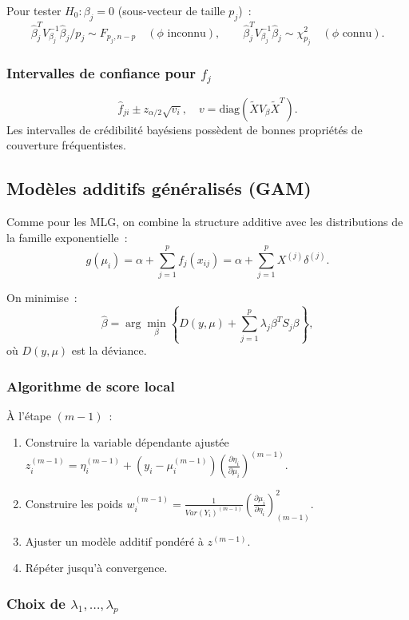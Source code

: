 \documentclass[11pt,letterpaper]{article}
\begin{document}
Pour tester $H_0: \beta_j = 0$ (sous-vecteur de taille $p_j$)~:
$$\hat{\beta}_j^T V_{\beta_j}^{-1}\hat{\beta}_j / p_j \sim F_{p_j, n-p} \quad (\phi \text{ inconnu}), \qquad \hat{\beta}_j^T V_{\beta_j}^{-1}\hat{\beta}_j \sim \chi^2_{p_j} \quad (\phi \text{ connu}).$$

\subsubsection{Intervalles de confiance pour $f_j$}
$$\hat{f}_{ji} \pm z_{\alpha/2}\sqrt{v_i}, \quad v = \text{diag}(\tilde{X}V_\beta\tilde{X}^T).$$
Les intervalles de crédibilité bayésiens possèdent de bonnes propriétés de couverture fréquentistes.

\subsection{Modèles additifs généralisés (GAM)}

Comme pour les MLG, on combine la structure additive avec les distributions de la famille exponentielle~:
$$g(\mu_i) = \alpha + \sum_{j=1}^p f_j(x_{ij}) = \alpha + \sum_{j=1}^p X^{(j)}\delta^{(j)}.$$

On minimise~:
$$\hat{\beta} = \arg\min_\beta\left\{D(y,\mu) + \sum_{j=1}^p \lambda_j \beta^T S_j \beta\right\},$$
où $D(y,\mu)$ est la déviance.

\subsubsection{Algorithme de score local}

À l'étape $(m-1)$~:
\begin{enumerate}
\item Construire la variable dépendante ajustée $z_i^{(m-1)} = \eta_i^{(m-1)} + (y_i - \mu_i^{(m-1)})\left(\frac{\partial \eta_i}{\partial \mu_i}\right)^{(m-1)}$.
\item Construire les poids $w_i^{(m-1)} = \frac{1}{Var(Y_i)^{(m-1)}}\left(\frac{\partial \mu_i}{\partial \eta_i}\right)^2_{(m-1)}$.
\item Ajuster un modèle additif pondéré à $z^{(m-1)}$.
\item Répéter jusqu'à convergence.
\end{enumerate}

\subsubsection{Choix de $\lambda_1,\ldots,\lambda_p$}
\end{document}
